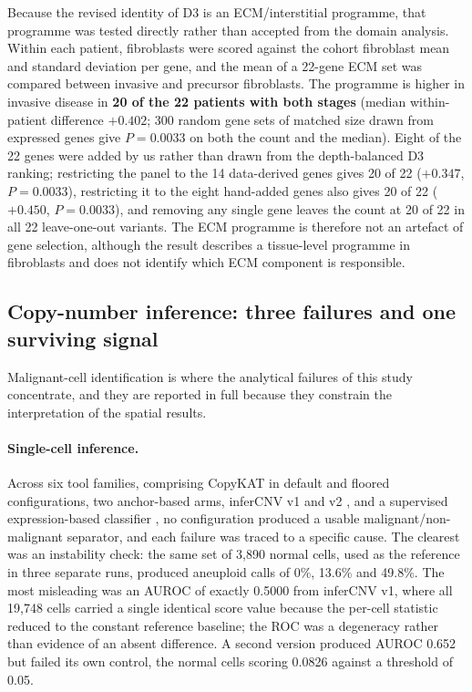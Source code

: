 Because the revised identity of D3 is an ECM/interstitial programme, that programme was
tested directly rather than accepted from the domain analysis. Within each patient,
fibroblasts were scored against the cohort fibroblast mean and standard deviation per gene,
and the mean of a 22-gene ECM set was compared between invasive and precursor fibroblasts.
The programme is higher in invasive disease in \textbf{20 of the 22 patients with both
stages} (median within-patient difference $+0.402$; 300 random gene sets of matched size
drawn from expressed genes give $P=0.0033$ on both the count and the median). Eight of the
22 genes were added by us rather than drawn from the depth-balanced D3 ranking; restricting
the panel to the 14 data-derived genes gives 20 of 22 ($+0.347$, $P=0.0033$), restricting it
to the eight hand-added genes also gives 20 of 22 ($+0.450$, $P=0.0033$), and removing any
single gene leaves the count at 20 of 22 in all 22 leave-one-out variants. The ECM programme
is therefore not an artefact of gene selection, although the result describes a tissue-level
programme in fibroblasts and does not identify which ECM component is responsible.

\subsection{Copy-number inference: three failures and one surviving signal}

Malignant-cell identification is where the analytical failures of this study concentrate,
and they are reported in full because they constrain the interpretation of the spatial
results.

\paragraph{Single-cell inference.} Across six tool families, comprising CopyKAT
\citep{gao2021copykat} in default and floored configurations, two anchor-based arms, inferCNV
v1 and v2 \citep{patel2014infercnv}, and a supervised expression-based classifier
\citep{scmalignantfinder2025}, no configuration produced a usable malignant/non-malignant
separator, and each failure was traced to a specific cause. The clearest was an instability
check: the same set of 3,890 normal cells, used as the reference in three separate runs,
produced aneuploid calls of 0\%, 13.6\% and 49.8\%. The most misleading was an AUROC of
exactly 0.5000 from inferCNV v1, where all 19,748 cells carried a single identical score
value because the per-cell statistic reduced to the constant reference baseline; the ROC was
a degeneracy rather than evidence of an absent difference. A second version produced AUROC
0.652 but failed its own control, the normal cells scoring 0.0826 against a threshold of
0.05.

